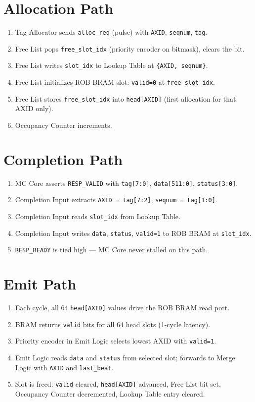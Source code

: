 \documentclass[11pt]{article}
\begin{document}
\section{Allocation Path}

\begin{enumerate}[noitemsep]
  \item Tag Allocator sends \texttt{alloc\_req} (pulse) with \texttt{AXID}, \texttt{seqnum}, \texttt{tag}.
  \item Free List pops \texttt{free\_slot\_idx} (priority encoder on bitmask), clears the bit.
  \item Free List writes \texttt{slot\_idx} to Lookup Table at \texttt{\{AXID, seqnum\}}.
  \item Free List initializes ROB BRAM slot: \texttt{valid=0} at \texttt{free\_slot\_idx}.
  \item Free List stores \texttt{free\_slot\_idx} into \texttt{head[AXID]} (first allocation for that AXID only).
  \item Occupancy Counter increments.
\end{enumerate}

\section{Completion Path}

\begin{enumerate}[noitemsep]
  \item MC Core asserts \texttt{RESP\_VALID} with \texttt{tag[7:0]}, \texttt{data[511:0]}, \texttt{status[3:0]}.
  \item Completion Input extracts \texttt{AXID = tag[7:2]}, \texttt{seqnum = tag[1:0]}.
  \item Completion Input reads \texttt{slot\_idx} from Lookup Table.
  \item Completion Input writes \texttt{data}, \texttt{status}, \texttt{valid=1} to ROB BRAM at \texttt{slot\_idx}.
  \item \texttt{RESP\_READY} is tied high — MC Core never stalled on this path.
\end{enumerate}

\section{Emit Path}

\begin{enumerate}[noitemsep]
  \item Each cycle, all 64 \texttt{head[AXID]} values drive the ROB BRAM read port.
  \item BRAM returns \texttt{valid} bits for all 64 head slots (1-cycle latency).
  \item Priority encoder in Emit Logic selects lowest AXID with \texttt{valid=1}.
  \item Emit Logic reads \texttt{data} and \texttt{status} from selected slot; forwards to Merge Logic with \texttt{AXID} and \texttt{last\_beat}.
  \item Slot is freed: \texttt{valid} cleared, \texttt{head[AXID]} advanced, Free List bit set, Occupancy Counter decremented, Lookup Table entry cleared.
\end{enumerate}
\end{document}

